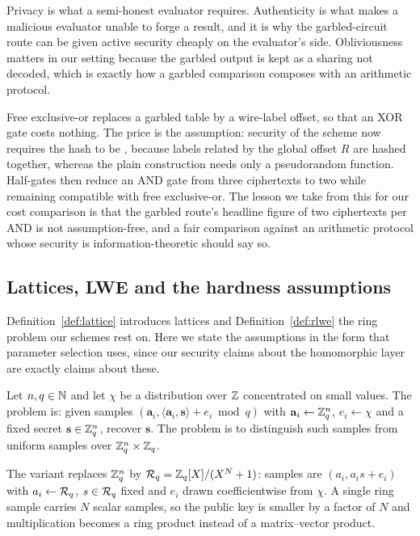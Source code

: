 Privacy is what a semi-honest evaluator requires. Authenticity is what makes a
malicious evaluator unable to forge a result, and it is why the garbled-circuit
route can be given active security cheaply on the evaluator's side. Obliviousness
matters in our setting because the garbled output is kept as a sharing not
decoded, which is exactly how a garbled comparison composes with an arithmetic
protocol.

\begin{remark}
\label{rem:freexor-assumption}
Free exclusive-or replaces a garbled table by a wire-label offset, so that an
XOR gate costs nothing. The price is the assumption: security of the scheme now
requires the hash to be , because labels related
by the global offset $R$ are hashed together, whereas the plain construction needs
only a pseudorandom function. Half-gates then reduce an AND gate from three
ciphertexts to two while remaining compatible with free exclusive-or. The lesson
we take from this for our cost comparison is that the garbled route's headline
figure of two ciphertexts per AND is not assumption-free, and a fair comparison
against an arithmetic protocol whose security is information-theoretic should say
so.
\end{remark}

\subsection{Lattices, LWE and the hardness assumptions}
\label{sec:found:lattice}

Definition~\ref{def:lattice} introduces lattices and Definition~\ref{def:rlwe}
the ring problem our schemes rest on. Here we state the assumptions in the form
that parameter selection uses, since our security claims about the homomorphic
layer are exactly claims about these.

\begin{definition}
\label{def:lwe}
Let $n,q \in \mathbb{N}$ and let $\chi$ be a distribution over $\mathbb{Z}$ concentrated on small
values. The  problem is: given samples
$(\mathbf{a}_i, \langle \mathbf{a}_i,\mathbf{s}\rangle + e_i \bmod q)$ with
$\mathbf{a}_i \gets \mathbb{Z}_q^n$, $e_i \gets \chi$ and a fixed secret
$\mathbf{s} \in \mathbb{Z}_q^n$, recover $\mathbf{s}$. The  problem is
to distinguish such samples from uniform samples over $\mathbb{Z}_q^n \times \mathbb{Z}_q$.
\end{definition}

\begin{definition}
\label{def:rlwe-restated}
The  variant replaces $\mathbb{Z}_q^n$ by $\mathcal{R}_q = \mathbb{Z}_q[X]/(X^N+1)$: samples are
$(a_i, a_i s + e_i)$ with $a_i \gets \mathcal{R}_q$, $s \in \mathcal{R}_q$ fixed and $e_i$ drawn
coefficientwise from $\chi$. A single ring sample carries $N$ scalar samples, so
the public key is smaller by a factor of $N$ and multiplication becomes a ring
product instead of a matrix--vector product.
\end{definition}

